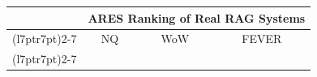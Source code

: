 
\begin{table}[]
\small
\centering
\begin{tabular}{lllllll}
\toprule
                                                                                & \multicolumn{6}{c}{\textbf{ARES Ranking of Real RAG Systems}}                                                                                                   \\
                                                                                \cmidrule(l{7pt}r{7pt}){2-7}
                                                                                & \multicolumn{2}{c}{NQ}                              & \multicolumn{2}{c}{WoW}                             & \multicolumn{2}{c}{FEVER}                           \\
                                                                                \cmidrule(l{7pt}r{7pt}){2-7}
                                                                                

\end{tabular}
\end{table}
